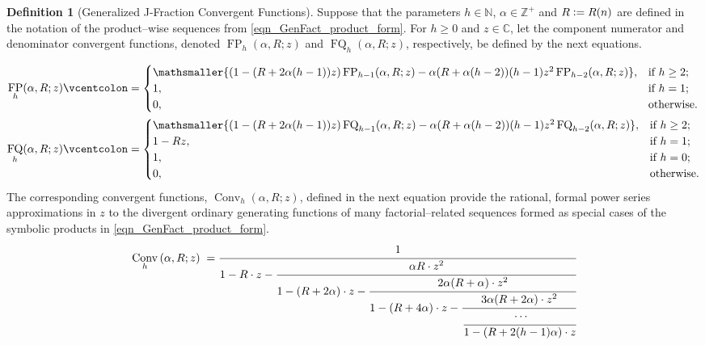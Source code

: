 \documentclass[12pt,reqno]{article}
\renewenvironment{subequations}{%
  \refstepcounter{equation}%
  \edef\theparentequation{\theequation}%
  \setcounter{parentequation}{\value{equation}}%
  \setcounter{equation}{0}%
  \def\theequation{\theparentequation.\alph{equation}}%
  \ignorespaces
}{%
  \setcounter{equation}{\value{parentequation}}%
  \ignorespacesafterend
}
\numberwithin{sfootnote}{section}
\numberwithin{equation}{section}
\theoremstyle{DefaultTheoremStyle}
\theoremstyle{definition}
\newtheorem{definition}[theorem]{Definition}
\newcommand{\defequals}{\ensuremath{\vcentcolon=}}
\newcommand{\StartGroupingSubEquations}{\begin{subequations}}
\newcommand{\EndGroupingSubEquations}{\end{subequations}}
\newcommand{\ConvGF}[4]{\ensuremath{\Conv_{#1}\left(#2, #3; #4\right)}}
\DeclareMathOperator{\FP}{FP}
\DeclareMathOperator{\FQ}{FQ}
\DeclareMathOperator{\Conv}{Conv}
\begin{document}
\begin{definition}[Generalized J-Fraction Convergent Functions] 
\label{def_GenConvFns_PFact_Phz_eqn_QFact_Qhz-defs_intro_v1} 
Suppose that the parameters 
$h \in \mathbb{N}$, $\alpha \in \mathbb{Z}^{+}$ and $R \defequals R(n)$ 
are defined in the notation of the product--wise sequences from 
\eqref{eqn_GenFact_product_form}. 
For $h \geq 0$ and $z \in \mathbb{C}$, let the component 
numerator and denominator convergent functions, denoted  
$\FP_h(\alpha, R; z)$ and $\FQ_h(\alpha, R; z)$, respectively, 
be defined by the next equations.
\StartGroupingSubEquations 
\begin{align} 
\label{eqn_PFact_Phz} 
\FP_h(\alpha, R; z) & \defequals 
     \begin{cases} 
     \mathsmaller{(1-(R+2\alpha(h-1))z)\FP_{h-1}(\alpha, R; z)- 
     \alpha(R+\alpha(h-2))(h-1) z^2 \FP_{h-2}(\alpha, R; z)}, & 
     \text{if $h \geq 2$;} \\ 
     1, & \text{if $h = 1$;} \\ 
     0, & \text{otherwise.} 
     \end{cases} \\ 
\label{eqn_QFact_Qhz} 
\FQ_h(\alpha, R; z) & \defequals 
     \begin{cases} 
     \mathsmaller{(1-(R+2\alpha(h-1))z)\FQ_{h-1}(\alpha, R; z)- 
     \alpha(R+\alpha(h-2))(h-1) z^2 \FQ_{h-2}(\alpha, R; z)}, & 
     \text{if $h \geq 2$;} \\ 
     1-Rz, & \text{if $h = 1$;} \\ 
     1, & \text{if $h = 0$;} \\ 
     0, & \text{otherwise.} 
     \end{cases} 
\end{align} 
\EndGroupingSubEquations 
The corresponding convergent functions, 
$\ConvGF{h}{\alpha}{R}{z}$, defined in the 
next equation provide the 
rational, formal power series approximations in $z$ to the 
divergent ordinary generating functions of many factorial--related sequences 
formed as special cases of the symbolic products in 
\eqref{eqn_GenFact_product_form}. 
\begin{align} 
\notag 
\ConvGF{h}{\alpha}{R}{z} & \phantom{:} = 
     \cfrac{1}{1 - R \cdot z - 
     \cfrac{\alpha R \cdot z^2}{ 
            1 - (R+2\alpha) \cdot z -
     \cfrac{2\alpha (R + \alpha) \cdot z^2}{ 
            1 - (R + 4\alpha) \cdot z - 
     \cfrac{3\alpha (R + 2\alpha) \cdot z^2}{ 
     \cfrac{\cdots}{1 - (R + 2 (h-1) \alpha) \cdot z}}}}} \\ 

\end{align}
\end{definition}
\end{document}
